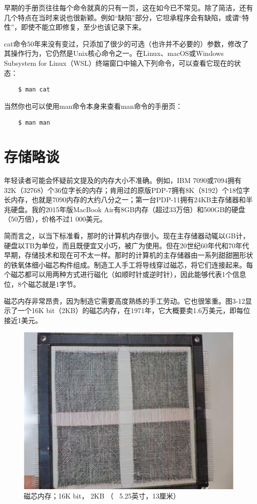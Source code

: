 \documentclass[a4paper,12pt,UTF8,twoside]{ctexbook}
\begin{document}
早期的手册页往往每个命令就真的只有一页，这在如今已不常见。除了简洁，还有几个特点在当时来说也很新颖。例如“缺陷”部分，它坦承程序会有缺陷，或谓“特性”，即使不能立即修复，至少也该记录下来。

cat命令50年来没有变过，只添加了很少的可选（也许并不必要的）参数，修改了其操作行为，它仍然是Unix核心命令之一。在Linux、macOS或Windows Subsystem for Linux（WSL）终端窗口中输入下列命令，可以查看它现在的状态：

\begin{lstlisting}
	$ man cat
\end{lstlisting}

当然你也可以使用man命令本身来查看man命令的手册页：

\begin{lstlisting}
	$ man man
\end{lstlisting}

\section{存储略谈}

年轻读者可能会怀疑前文提及的内存大小不准确。例如，IBM 7090或7094拥有32K（32768）个36位字长的内存；肯用过的原版PDP-7拥有8K（8192）个18位字长内存，也就是7090内存的大约八分之一；第一台PDP-11拥有24KB主存储器和半兆硬盘。我的2015年版MacBook Air有8GB内存（超过33万倍）和500GB的硬盘（50万倍），价格不过1 000美元。

简而言之，以当下标准看，那时的计算机内存很小。现在主存储器动辄以GB计，硬盘以TB为单位，而且既便宜又小巧，被广为使用。但在20世纪60年代和70年代早期，存储技术和现在可不太一样。那时的计算机的主存储器由一系列甜甜圈形状的铁氧体细小磁芯构件组成。制造工人手工将导线穿过磁芯，将它们连接起来。每个磁芯都可以用两种方式进行磁化（如顺时针或逆时针），因此能够代表1个信息位，8个磁芯就是1字节。

磁芯内存非常昂贵，因为制造它需要高度熟练的手工劳动。它也很笨重。图3-12显示了一个16K bit（2KB）的磁芯内存，在1971年，它大概要卖1.6万美元，即每位接近1美元。

\begin{figure}[htbp]
	\centering
	\includegraphics[width=0.7\linewidth]{30}
	\caption{磁芯内存；16K bit， 2KB （ ~5.25英寸，13厘米）}
	\label{fig:1}
\end{figure}
\end{document}
